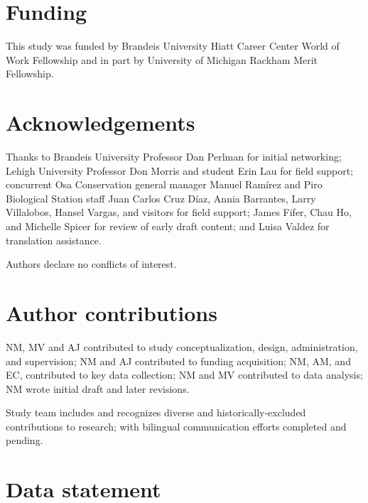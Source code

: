 \documentclass[
  12pt,
]{article}
\begin{document}
\newpage

\hypertarget{funding}{%
\section*{Funding}\label{funding}}

This study was funded by Brandeis University Hiatt Career Center World of Work Fellowship and in part by University of Michigan Rackham Merit Fellowship.

\hypertarget{acknowledgements}{%
\section*{Acknowledgements}\label{acknowledgements}}

Thanks to
Brandeis University Professor Dan Perlman for initial networking;
Lehigh University Professor Don Morris
and student Erin Lau
for field support;
concurrent Osa Conservation general manager Manuel Ramírez and Piro Biological Station staff Juan Carlos Cruz Díaz, Annia Barrantes, Larry Villalobos, Hansel Vargas, and visitors for field support;
James Fifer, Chau Ho, and Michelle Spicer for review of early draft content;
and Luisa Valdez for translation assistance.

Authors declare no conflicts of interest.

\hypertarget{author-contributions}{%
\section*{Author contributions}\label{author-contributions}}

NM, MV and AJ contributed to study conceptualization, design, administration, and supervision;
NM and AJ contributed to funding acquisition;
NM, AM, and EC,
contributed to key data collection;
NM and MV contributed to data analysis;
NM wrote initial draft and later revisions.

Study team includes and recognizes diverse and historically-excluded contributions to research; with bilingual communication efforts completed and pending.

\hypertarget{data-statement}{%
\section*{Data statement}\label{data-statement}}
\end{document}
